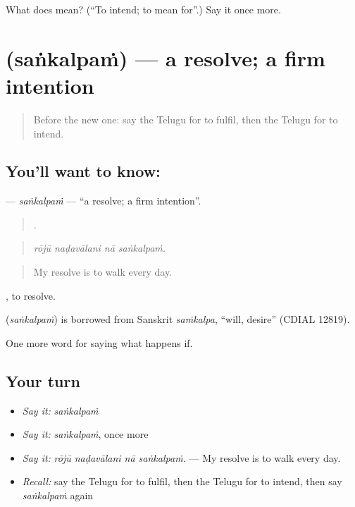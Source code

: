 \begin{tcolorbox}[breakable,colback=teal!4,colframe=teal!35!black,title={Before you move on}]
What does  mean? (\textquotedblleft{}To intend; to mean for\textquotedblright{}.) Say it once more.
\end{tcolorbox}
\section[\texorpdfstring{\te{సంకల్పం} (saṅkalpaṁ)}{సంకల్పం (saṅkalpaṁ)}]{ (saṅkalpaṁ) — a resolve; a firm intention}

\label{lesson:TE-C422-sankalpam}



\begin{quote}
Before the new one: say the Telugu for to fulfil, then the Telugu for to intend.
\end{quote}

\subsection*{You'll want to know: }
\textbf{} — \emph{saṅkalpaṁ} — \textquotedblleft{}a resolve; a firm intention\textquotedblright{}.

\begin{quote}
   .
\end{quote}

\begin{quote}
\emph{rōjū naḍavālani nā saṅkalpaṁ.}
\end{quote}

\begin{quote}
My resolve is to walk every day.
\end{quote}

, to resolve.

\begin{cousinweb}
\textbf{} (\emph{saṅkalpaṁ}) is borrowed from Sanskrit \emph{saṁkalpa}, \textquotedblleft{}will, desire\textquotedblright{} (CDIAL 12819).
\end{cousinweb}

\begin{grammarlens}[title={What you've built}]
One more word for saying what happens if.
\end{grammarlens}

\subsection*{Your turn}
\begin{itemize}
\raggedright
  \item \emph{Say it:} \emph{saṅkalpaṁ}
  \item \emph{Say it:} \emph{saṅkalpaṁ}, once more
  \item \emph{Say it:} \emph{rōjū naḍavālani nā saṅkalpaṁ.} — My resolve is to walk every day.
  \item \emph{Recall:} say the Telugu for to fulfil, then the Telugu for to intend, then say \emph{saṅkalpaṁ} again
\end{itemize}

